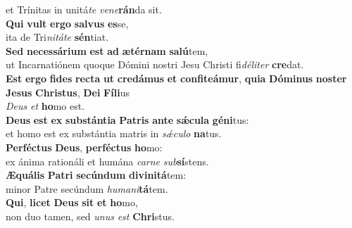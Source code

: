 \oddverse et Trínitas in unitá\textit{te} \textit{ve}\textit{ne}\textbf{rán}da sit.\\
\evenverse \textbf{Qui} \textbf{vult} \textbf{er}\textbf{go} \textbf{sal}\textbf{vus} \textbf{es}se,~\*\\
\evenverse ita de Tri\textit{ni}\textit{tá}\textit{te} \textbf{sén}tiat.\\
\oddverse \textbf{Sed} \textbf{ne}\textbf{ces}\textbf{sá}\textbf{ri}\textbf{um} \textbf{est} \textbf{ad} \textbf{æ}\textbf{tér}\textbf{nam} \textbf{sa}\textbf{lú}tem,~\*\\
\oddverse ut Incarnatiónem quoque Dómini nostri Jesu Christi fi\textit{dé}\textit{li}\textit{ter} \textbf{cre}dat.\\
\evenverse \textbf{Est} \textbf{er}\textbf{go} \textbf{fi}\textbf{des} \textbf{re}\textbf{cta} \textbf{ut} \textbf{cre}\textbf{dá}\textbf{mus} \textbf{et} \textbf{con}\textbf{fi}\textbf{te}\textbf{á}\textbf{mur}, \textbf{qui}\textbf{a} \textbf{Dó}\textbf{mi}\textbf{nus} \textbf{no}\textbf{ster} \textbf{Je}\textbf{sus} \textbf{Chri}\textbf{stus}, \textbf{De}\textbf{i} \textbf{Fí}\textbf{li}us~\*\\
\evenverse \textit{De}\textit{us} \textit{et} \textbf{ho}mo est.\\
\oddverse \textbf{De}\textbf{us} \textbf{est} \textbf{ex} \textbf{sub}\textbf{stán}\textbf{ti}\textbf{a} \textbf{Pa}\textbf{tris} \textbf{an}\textbf{te} \textbf{sǽ}\textbf{cu}\textbf{la} \textbf{gé}\textbf{ni}tus:~\*\\
\oddverse et homo est ex substántia matris in \textit{sǽ}\textit{cu}\textit{lo} \textbf{na}tus.\\
\evenverse \textbf{Per}\textbf{fé}\textbf{ctus} \textbf{De}\textbf{us}, \textbf{per}\textbf{fé}\textbf{ctus} \textbf{ho}mo:~\*\\
\evenverse ex ánima rationáli et humána \textit{car}\textit{ne} \textit{sub}\textbf{sí}stens.\\
\oddverse \textbf{Æ}\textbf{quá}\textbf{lis} \textbf{Pa}\textbf{tri} \textbf{se}\textbf{cún}\textbf{dum} \textbf{di}\textbf{vi}\textbf{ni}\textbf{tá}tem:~\*\\
\oddverse minor Patre secúndum \textit{hu}\textit{ma}\textit{ni}\textbf{tá}tem.\\
\evenverse \textbf{Qui}, \textbf{li}\textbf{cet} \textbf{De}\textbf{us} \textbf{sit} \textbf{et} \textbf{ho}mo,~\*\\
\evenverse non duo tamen, sed \textit{u}\textit{nus} \textit{est} \textbf{Chri}stus.\\
